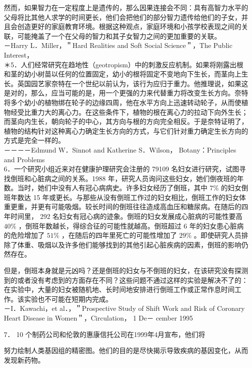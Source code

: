 然而，如果智力在一定程度上是遗传的，那么因果连接会不同：具有高智力水平的父母将比其他人求学的时间更长，他们会把他们的部分智力遗传给他们的子女，并且会创造更好的家庭教育环境。根据这种观点，家庭环境和小孩学校表现之间的关联，可能掩盖了一个在父母的智力和其子女智力之间的更加重要的关联。\\
－Harry L．Miller，＂Hard Realities and Soft Social Science＂，The Public Interest，\\
＊5．人们经常研究在趋地性（geotropism）中的刺激反应机制。如果将刚露出根和茎的幼小树苗以任何的位置固定，幼小的根将固定不变地向下生长，而茎向上生长。英国园艺家奈特在一个世纪以前认为，该行为应归于重力。他推理说，如果这是对的，那么，应当可能的是，用一个更强的力来代替重力将改变生长方向。奈特将多个幼小的植物绑在轮子的边缘四周，他在水平方向上迅速转动轮子，从而使植物经受比重力大的离心力。在这些条件下，植物的根在离心力的拉动下向外生长；而茎向内生长，朝向轮子的中心，其方向与根的方向完全相反。于是奈特证明了，植物的结构针对这种离心力确定生长方向的方式，与它们针对重力确定生长方向的方式是完全一样的。\\
－－－－Edmund W．Sinnot and Katherine S．Wilson， Botany：Principles and Problems\\
6．一个研究小组近来对在健康护理研究会注册的 79109 名妇女进行研究，试图寻找倒班和心脏病之间的关系。1988 年，研究人员询问这些妇女，她们倒夜班的年数。当时，她们中没有人有冠心病病史。许多妇女经历了倒班，其中 $7 \%$ 的妇女倒班年数达 15 年或更长。与那些从没有倒班工作过的妇女相比，倒班工作的妇女体重更重，并更有可能吸烟。较长时间的倒班往往造成高血压和糖尿病。在随后的四年时间里， 292 名妇女有冠心病的迹象。倒班的妇女发展成心脏病的可能性要高 $40 \%$ ，倒班年数越长，得综合征的可能性就越高。倒班超过 6 年的妇女患心脏病的危险增加了 $51 \%$ ，在随后的四年里死亡的可能性增加了 $29 \%$ 。即使研究人员排除了体重、吸烟以及许多他们能够找到的其他引起心脏疾病的因素，倒班的影响仍然存在。

但是，倒班本身就是元凶吗？还是倒班的妇女与不倒班的妇女，在该研究没有探测到的或者没有考虑到的方面存在不同？这些问题不通过这样的实验是解决不了的：在实验中，大量的妇女被随机地、长时间地安排进行倒班工作或正常作息时间工作。该实验也不可能在短期内完成。\\
－I．Kawachi，et al．，＂Prospective Study of Shift Work and Risk of Coronary Heart Disease in Women＂，Circulation， 1 De－ cember 1995

7． 10 个制药公司和伦敦的惠康信托公司在1999年4月宣布，他们将

努力绘制人类基因组的精密图。他们的目的是尽快揭示导致疾病的基因变化，从而发现新药物。

